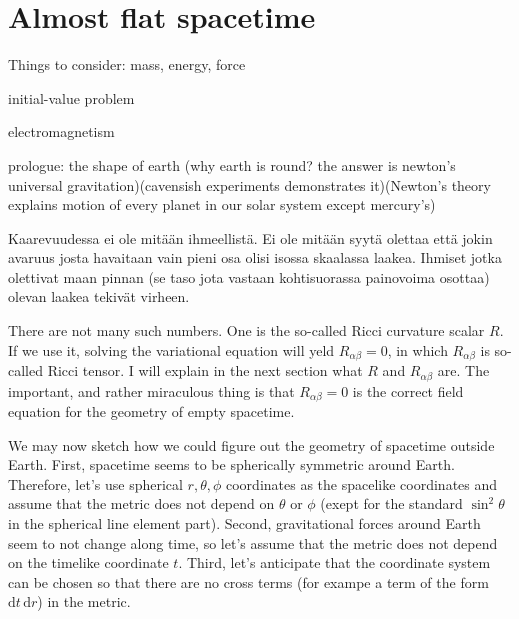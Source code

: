 \documentclass[11pt,oneside%
]{memoir}
\newcommand{\dd}{\mathrm{d}}
\begin{document}

\chapter{Almost flat spacetime}

Things to consider: mass, energy, force

initial-value problem

electromagnetism

prologue: the shape of earth (why earth is round? the answer is newton's universal gravitation)(cavensish experiments demonstrates it)(Newton's theory explains motion of every planet in our solar system except mercury's)

\newpage
\tableofcontents

Kaarevuudessa ei ole mitään ihmeellistä. Ei ole mitään syytä olettaa että jokin avaruus josta havaitaan vain pieni osa olisi isossa skaalassa laakea. Ihmiset jotka olettivat maan pinnan (se taso jota vastaan kohtisuorassa painovoima osottaa) olevan laakea tekivät virheen.

\newpage
There are not many such numbers. One is the so-called Ricci curvature scalar \(R\). If we use it, solving the variational equation will yeld \(R_{\alpha\beta}=0\), in which \(R_{\alpha\beta}\) is so-called Ricci tensor. I will explain in the next section what \(R\) and \(R_{\alpha\beta}\) are. The important, and rather miraculous thing is that \(R_{\alpha\beta}=0\) is the correct field equation for the geometry of empty spacetime.


We may now sketch how we could figure out the geometry of spacetime outside Earth. First, spacetime seems to be spherically symmetric around Earth. Therefore, let's use spherical \(r,\theta,\phi\) coordinates as the spacelike coordinates and assume that the metric does not depend on \(\theta\) or \(\phi\) (exept for the standard \(\sin^2\theta\) in the spherical line element part). Second, gravitational forces around Earth seem to not change along time, so let's assume that the metric does not depend on the timelike coordinate \(t\). Third, let's anticipate that the coordinate system can be chosen so that there are no cross terms (for exampe a term of the form \(\dd t\,\dd r\)) in the metric.
\end{document}
